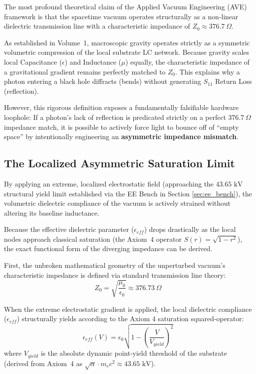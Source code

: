The most profound theoretical claim of the Applied Vacuum Engineering (AVE) framework is that the spacetime vacuum operates structurally as a non-linear dielectric transmission line with a characteristic impedance of $Z_0 \approx 376.7\ \Omega$. 

As established in Volume~1, macroscopic gravity operates strictly as a symmetric volumetric compression of the local substrate LC network. Because gravity scales local Capacitance ($\epsilon$) and Inductance ($\mu$) equally, the characteristic impedance of a gravitational gradient remains perfectly matched to $Z_0$. This explains why a photon entering a black hole diffracts (bends) without generating $S_{11}$ Return Loss (reflection). 

However, this rigorous definition exposes a fundamentally falsifiable hardware loophole: If a photon's lack of reflection is predicated strictly on a perfect $376.7\ \Omega$ impedance match, it is possible to actively force light to bounce off of ``empty space'' by intentionally engineering an \textbf{asymmetric impedance mismatch}. 

\subsection{The Localized Asymmetric Saturation Limit}

By applying an extreme, localized electrostatic field (approaching the $43.65\text{ kV}$ structural yield limit established via the EE Bench in Section \ref{sec:ee_bench}), the volumetric dielectric compliance of the vacuum is actively strained without altering its baseline inductance. 

Because the effective dielectric parameter ($\epsilon_{eff}$) drops drastically as the local nodes approach classical saturation (the Axiom~4 operator $S(r) = \sqrt{1-r^2}$), the exact functional form of the diverging impedance can be derived. 

First, the unbroken mathematical geometry of the unperturbed vacuum's characteristic impedance is defined via standard transmission line theory:
\begin{equation}
Z_0 = \sqrt{\frac{\mu_0}{\epsilon_0}} \approx 376.73\ \Omega
\end{equation}

When the extreme electrostatic gradient is applied, the local dielectric compliance ($\epsilon_{eff}$) structurally yields according to the Axiom 4 saturation squared-operator:
\begin{equation}
\epsilon_{eff}(V) = \epsilon_0 \sqrt{1 - \left(\frac{V}{V_{yield}}\right)^2}
\end{equation}
where $V_{yield}$ is the absolute dynamic point-yield threshold of the substrate (derived from Axiom~4 as $\sqrt{\alpha} \cdot m_e c^2 \approx 43.65\text{ kV}$).

